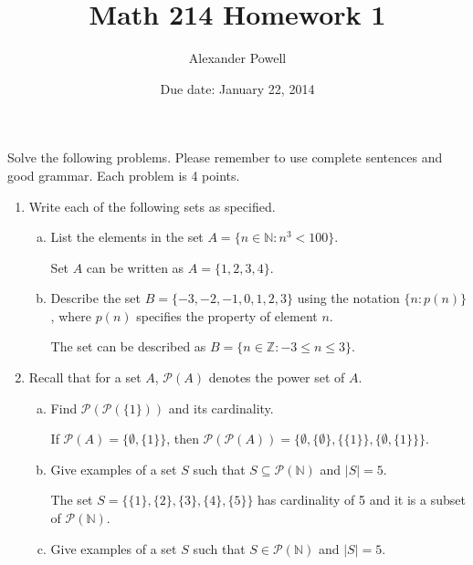 \documentclass[10pt]{article} %
\title{Math 214  Homework 1}
\date{Due date: January 22, 2014}
\author{Alexander Powell}
\newcommand{\cP}{\mathcal{P}}
\newcommand{\N}{\mathbb{N}}
\newcommand{\Z}{\mathbb{Z}}
\begin{document}
\maketitle

Solve the following problems. Please remember to use complete sentences
and good grammar. Each problem is 4 points.



\begin{enumerate}
\item Write each of the following sets as specified.
  \begin{enumerate}[(a)]
  \item List the elements in the set $A=\{n\in \N: n^3<100\}$.
  
  \bigskip
  
    Set $A$ can be written as $A = \{1,2,3,4\}$.
  
  \bigskip
  
  \item Describe the set $B = \{-3,-2,-1,0,1,2,3\}$ using the notation
    $\{n : p(n)\}$, where $p(n)$ specifies the property of element $n$.
    
  \bigskip
  
    The set can be described as $B = \{n\in\Z: -3 \leq n \leq 3\}$.
  \bigskip
  
  \end{enumerate}


\item Recall that for a set $A$, $\cP(A)$ denotes the power set of $A$.
  \begin{enumerate}[(a)]
  \item Find $\cP(\cP(\{1\}))$ and its cardinality.
  
  \bigskip
  
   If $\cP(A) = \{\emptyset,\{1\}\}$, then $\cP(\cP(A)) = \{\emptyset,\{\emptyset\},\{\{1\}\},\{\emptyset,\{1\}\}\}$.
  
  \bigskip
  
  \item Give examples of a set $S$ such that $S\subseteq \cP(\N)$ and $|S|=5$.
  
  \bigskip
  
    The set $S = \{\{1\},\{2\},\{3\},\{4\},\{5\}\}$ has cardinality of 5 and it is a subset of $\cP(\N)$.
  
  \bigskip
  
  \item Give examples of a set $S$ such that $S\in \cP(\N)$ and $|S|=5$.
  

\end{enumerate}
\end{enumerate}
\end{document}
